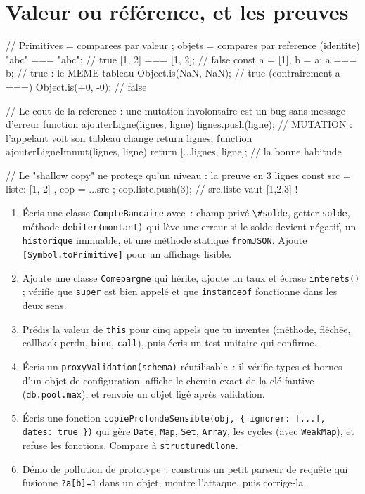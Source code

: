 \section{Valeur ou r\'ef\'erence, et les preuves}

\begin{codejs}
// Primitives = comparees par valeur ; objets = compares par reference (identite)
"abc" === "abc";                    // true
[1, 2] === [1, 2];                  // false
const a = [1], b = a; a === b;      // true : le MEME tableau
Object.is(NaN, NaN);                // true (contrairement a ===)
Object.is(+0, -0);                  // false

// Le cout de la reference : une mutation involontaire est un bug sans message d'erreur
function ajouterLigne(lignes, ligne) {
  lignes.push(ligne);               // MUTATION : l'appelant voit son tableau change
  return lignes;
}
function ajouterLigneImmut(lignes, ligne) { return [...lignes, ligne]; }   // la bonne habitude

// Le "shallow copy" ne protege qu'un niveau : la preuve en 3 lignes
const src = { liste: [1, 2] }, cop = { ...src };
cop.liste.push(3);                  // src.liste vaut [1,2,3] !
\end{codejs}

\begin{exercice}
\begin{enumerate}
  \item \'Ecris une classe \verb|CompteBancaire| avec~: champ priv\'e \verb|\#solde|, getter
        \verb|solde|, m\'ethode \verb|debiter(montant)| qui l\`eve une erreur si le solde devient
        n\'egatif, un \verb|historique| immuable, et une m\'ethode statique \verb|fromJSON|.
        Ajoute \verb|[Symbol.toPrimitive]| pour un affichage lisible.
  \item Ajoute une classe \verb|Comepargne| qui h\'erite, ajoute un taux et \'ecrase
        \verb|interets()| ; v\'erifie que \verb|super| est bien appel\'e et que \verb|instanceof|
        fonctionne dans les deux sens.
  \item Pr\'edis la valeur de \verb|this| pour cinq appels que tu inventes (m\'ethode, fl\'ech\'ee,
        callback perdu, \verb|bind|, \verb|call|), puis \'ecris un test unitaire qui confirme.
  \item \'Ecris un \verb|proxyValidation(schema)| r\'eutilisable~: il v\'erifie types et bornes
        d'un objet de configuration, affiche le chemin exact de la cl\'e fautive
        (\verb|db.pool.max|), et renvoie un objet fig\'e apr\`es validation.
  \item \'Ecris une fonction \verb|copieProfondeSensible(obj, { ignorer: [...], dates: true })|
        qui g\`ere \verb|Date|, \verb|Map|, \verb|Set|, \verb|Array|, les cycles
        (avec \verb|WeakMap|), et refuse les fonctions. Compare \`a \verb|structuredClone|.
  \item D\'emo de pollution de prototype~: construis un petit parseur de requ\^ete
        qui fusionne \verb|?a[b]=1| dans un objet, montre l'attaque, puis corrige-la.
\end{enumerate}
\end{exercice}

